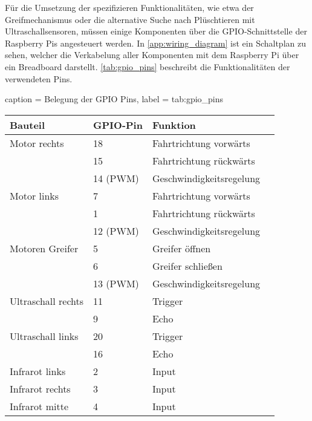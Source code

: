 Für die Umsetzung der spezifizieren Funktionalitäten, wie etwa der Greifmechanismus oder die alternative Suche nach Plüschtieren mit Ultraschallsensoren, müssen einige Komponenten über die \ac{GPIO}-Schnittstelle der Raspberry Pis angesteuert werden.
In \autoref{app:wiring_diagram} ist ein Schaltplan zu sehen, welcher die Verkabelung aller Komponenten mit dem Raspberry Pi über ein Breadboard darstellt.
\autoref{tab:gpio_pins} beschreibt die Funktionalitäten der verwendeten Pins.

\begin{dhbwtable}{%
    caption	= Belegung der \ac{GPIO} Pins,
    label	= tab:gpio_pins
}
    \begin{tabular}{llll}
        \toprule
        \textbf{Bauteil} & \textbf{\ac{GPIO}-Pin} & \textbf{Funktion} \\\midrule
        Motor rechts   	    & 18        & Fahrtrichtung vorwärts\\
                            & 15        & Fahrtrichtung rückwärts\\
                            & 14 (PWM)  & Geschwindigkeitsregelung\\
        Motor links   	    & 7         & Fahrtrichtung vorwärts\\
                            & 1         & Fahrtrichtung rückwärts\\
                            & 12 (PWM)  & Geschwindigkeitsregelung\\    
        Motoren Greifer   	& 5         & Greifer öffnen\\
                            & 6         & Greifer schließen\\
                            & 13 (PWM)  & Geschwindigkeitsregelung\\
        Ultraschall rechts 	& 11        & Trigger\\
                            & 9         & Echo\\
        Ultraschall links   & 20        & Trigger\\
                            & 16        & Echo \\ 
        Infrarot links      & 2         & Input\\
        Infrarot rechts     & 3         & Input\\
        Infrarot mitte      & 4         & Input\\\bottomrule
    \end{tabular}    
\end{dhbwtable}

